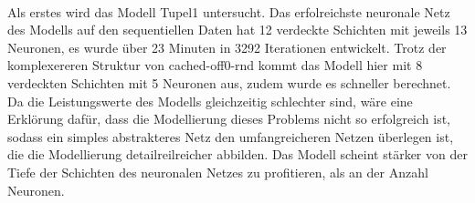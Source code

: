 \documentclass[
	12pt,
	a4paper,
	BCOR10mm,
	DIV14,
	listof=totoc,
	bibliography=totoc,
	headsepline
]{scrreprt}
\begin{document}
\begin{table}
	\scriptsize
	\\
	\caption{Informationen über die Ausreißervorhersage der höheren Modelle}
	\label{tab:outlier}
\end{table}

Als erstes wird das Modell Tupel1 untersucht. 
Das erfolreichste neuronale Netz des Modells auf den sequentiellen Daten hat 12 verdeckte Schichten mit jeweils 13 Neuronen, es wurde über 23 Minuten in 3292 Iterationen entwickelt. Trotz der komplexereren Struktur von cached-off0-rnd kommt das Modell hier mit 8 verdeckten Schichten mit 5 Neuronen aus, zudem wurde es schneller berechnet. Da die Leistungswerte des Modells gleichzeitig schlechter sind, wäre eine Erklörung dafür, dass die Modellierung dieses Problems nicht so erfolgreich ist, sodass ein simples abstrakteres Netz den umfangreicheren Netzen überlegen ist, die die Modellierung detailreilreicher abbilden. Das Modell scheint stärker von der Tiefe der Schichten des neuronalen Netzes zu profitieren, als an der Anzahl Neuronen. 
\end{document}
